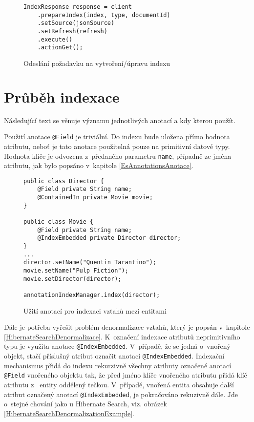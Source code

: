 \documentclass[11pt,oneside]{fithesis2}
\begin{document}
\begin{figure}[!htbp]
\begin{lstlisting}[frame=single]
IndexResponse response = client
	.prepareIndex(index, type, documentId)
	.setSource(jsonSource)
	.setRefresh(refresh)
	.execute()
	.actionGet();
\end{lstlisting}
\caption{Odeslání požadavku na vytvoření/úpravu indexu}
\label{EsAnnotationsIndexaceOdeslaniPozadavkuExample}
\end{figure}

\newpage

\section{Průběh indexace}
\label{EsAnnotationsIndexacniCast}
Následující text se věnuje významu jednotlivých anotací a kdy kterou použít.

Použití anotace \texttt{@Field} je triviální. Do indexu bude uložena přímo hodnota atributu, neboť je tato anotace použitelná pouze na primitivní datové typy. Hodnota klíče je odvozena z~předaného parametru \texttt{name}, případně ze jména atributu, jak bylo popsáno v~kapitole \ref{EsAnnotationsAnotace}. 

\begin{figure}[hb]
\begin{lstlisting}[frame=single]
public class Director {
	@Field private String name;
	@ContainedIn private Movie movie;
}

public class Movie {
	@Field private String name;
	@IndexEmbedded private Director director;	
}
...
director.setName("Quentin Tarantino");
movie.setName("Pulp Fiction");
movie.setDirector(director);

annotationIndexManager.index(director);
\end{lstlisting}
\caption{Užití anotací pro indexaci vztahů mezi entitami}
\label{IndexingRelationsExample}
\end{figure}

Dále je potřeba vyřešit problém denormalizace vztahů, který je popsán v~kapitole \ref{HibernateSearchDenormalizace}. K~označení indexace atributů neprimitivního typu je využita anotace \texttt{@IndexEmbedded}. V~případě, že se jedná o~vnořený objekt, stačí příslušný atribut označit anotací \texttt{@IndexEmbedded}. Indexační mechanismus přidá do indexu rekurzivně všechny atributy označené anotací \texttt{@Field} vnořeného objektu tak, že před jméno klíče vnořeného atributu přidá klíč atributu z~ entity oddělený tečkou. V~případě, vnořená entita obsahuje další atribut označený anotací \texttt{@IndexEmbedded}, je pokračováno rekuzivně dále. Jde o~stejné chování jako u Hibernate Search, viz. obrázek \ref{HibernateSearchDenormalizationExample}.
\end{document}
